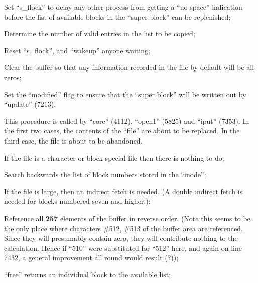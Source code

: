 \item[6972:] Set ``s\_flock'' to delay any  other
  process from getting a ``no space''
  indication  before  the  list  of
  available  blocks  in  the ``super
  block'' can be replenished;

\item[6975:] Determine  the  number  of  valid
entries in the list to be copied;

\item[6978:] Reset  ``s\_flock'',  and   ``wakeup''
      anyone waiting;

\item[6982:] Clear  the  buffer  so  that  any
      information  recorded in the file
      by default will be all zeros;

\item[6983:] Set the ``modified'' flag to ensure
      that  the  ``super  block'' will be
      written out by ``update'' (7213).
\ed


This  procedure  is  called  by  ``core''
(4112),   ``open1''   (5825)  and  ``iput''
(7353). In the  first  two  cases,  the
contents  of the ``file'' are about to be
replaced.  In the third case, the  file
is about to be abandoned.

\bd
\item[7421:] If the file  is  a  character  or
      block  special file then there is
      nothing to do;

\item[7423:] Search  backwards  the  list   of
      block   numbers   stored  in  the
      ``inode'';

\item[7425:] If the file is large,  then  an
indirect fetch is needed. (A double indirect fetch is needed  for
blocks    numbered    seven   and
higher.);


\item[7427:] Reference all {\bf 257} elements of the
  buffer  in  reverse  order. (Note
  this seems to be the  only  place
  where  characters  \#512,  \#513 of
  the buffer area  are  referenced.
  Since  they  will presumably contain zero, they  will  contribute
  nothing to the calculation. Hence
  if  ``510''  were  substituted  for
  ``512''  here,  and  again  on line
  7432, a general  improvement  all
  round would result (?));


\item[7438:] ``free''  returns   an   individual
      block to the available list;


